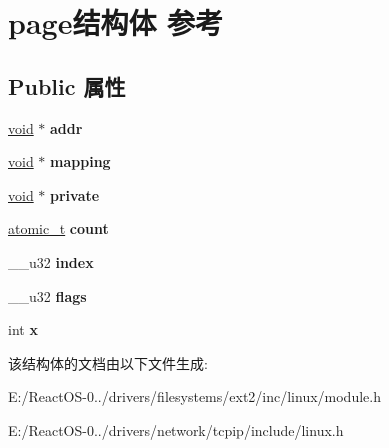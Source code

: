 \hypertarget{structpage}{}\section{page结构体 参考}
\label{structpage}
\subsection*{Public 属性}
\begin{DoxyCompactItemize}
\item 
\mbox{\label{structpage_aeab2f7acea6911f9e6e496382bd9297b}} 
\hyperlink{interfacevoid}{void} $\ast$ {\bfseries addr}
\item 
\mbox{\label{structpage_aafc872eeefe38de87ec0070d54e78af2}} 
\hyperlink{interfacevoid}{void} $\ast$ {\bfseries mapping}
\item 
\mbox{\label{structpage_a73174e5f88a777f2802a5cfa3ea83dbc}} 
\hyperlink{interfacevoid}{void} $\ast$ {\bfseries private}
\item 
\mbox{\label{structpage_a8871d572cfcaeba5191d5017f914a328}} 
\hyperlink{structatomic__t}{atomic\+\_\+t} {\bfseries count}
\item 
\mbox{\label{structpage_ae11894b4d3575ae0aa6ece59f636cda4}} 
\+\_\+\+\_\+u32 {\bfseries index}
\item 
\mbox{\label{structpage_a499157ceafe2e2e8424457d66e6f8e0d}} 
\+\_\+\+\_\+u32 {\bfseries flags}
\item 
\mbox{\label{structpage_a2bcaa01ce2bb74412ccc00c5b9d57f1a}} 
int {\bfseries x}
\end{DoxyCompactItemize}


该结构体的文档由以下文件生成\+:\begin{DoxyCompactItemize}
\item 
E\+:/\+React\+O\+S-\/0../drivers/filesystems/ext2/inc/linux/module.\+h\item 
E\+:/\+React\+O\+S-\/0../drivers/network/tcpip/include/linux.\+h\end{DoxyCompactItemize}
